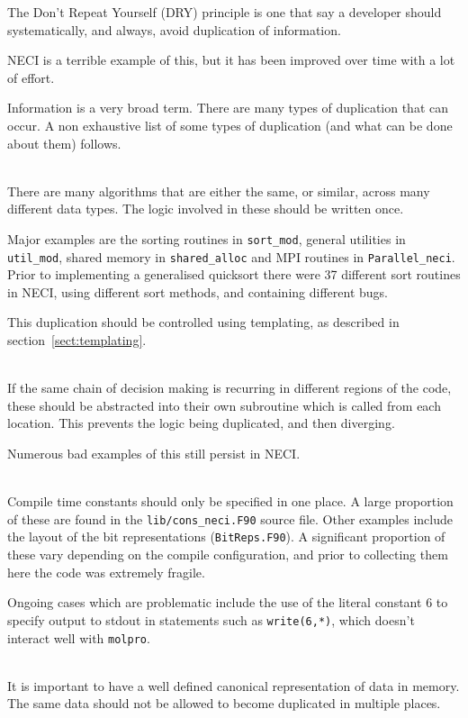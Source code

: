 \documentclass[a4paper,notitlepage]{scrreprt}
\newcommand\headitem[1]{\needspace{1.5\baselineskip}\item[{\boldmath #1 \nopagebreak}] \hfill \\ \nopagebreak}
\let\code\lstinline
\begin{document}
	The Don't Repeat Yourself (DRY) principle is one that say a developer
	should systematically, and always, avoid duplication of information.

	NECI is a terrible example of this, but it has been improved over time
	with a lot of effort.

	Information is a very broad term. There are many types of duplication that
	can occur. A non exhaustive list of some types of duplication (and what
	can be done about them) follows.
	\begin{description}
		\headitem{Algorithm duplication across data types}
			There are many algorithms that are either the same, or similar,
			across many different data types. The logic involved in these
			should be written once.

			Major examples are the sorting routines in \code{sort_mod},
			general utilities in \code{util_mod}, shared memory in
			\code{shared_alloc} and MPI routines in
			\code{Parallel_neci}. Prior to implementing a generalised
			quicksort there were 37 different sort routines in NECI, using
			different sort methods, and containing different bugs.

			This duplication should be controlled using templating, as
			described in section~\ref{sect:templating}.

		\headitem{Logic duplication across source files}
			If the same chain of decision making is recurring in different
			regions of the code, these should be abstracted into their own
			subroutine which is called from each location. This prevents the
			logic being duplicated, and then diverging.

			Numerous bad examples of this still persist in NECI.

		\headitem{Duplication of data}
			Compile time constants should only be specified in one place. A
			large proportion of these are found in the
			\code{lib/cons_neci.F90} source file. Other examples include
			the layout of the bit representations (\code{BitReps.F90}).
			A significant proportion of these vary depending on the compile
			configuration, and prior to collecting them here the code was
			extremely fragile.

			Ongoing cases which are problematic include the use of the literal
			constant $6$ to specify output to stdout in statements such as
			\code{write(6,*)}, which doesn't interact well with
			\code{molpro}.

		\headitem{Duplication of representations in memory}
			It is important to have a well defined canonical representation of
			data in memory. The same data should not be allowed to become
			duplicated in multiple places.


\end{description}
\end{document}
